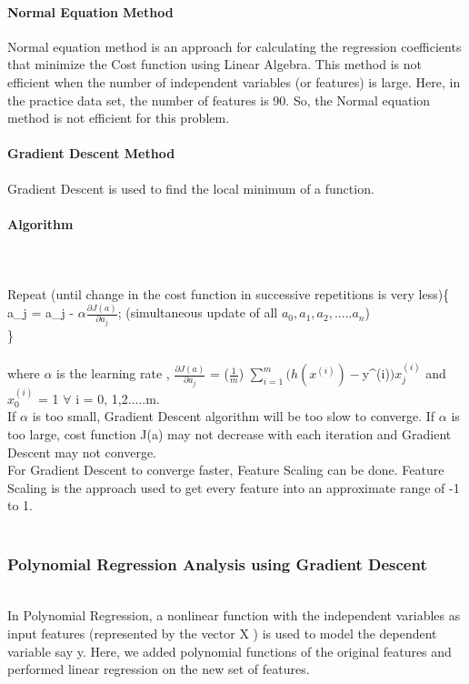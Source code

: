 \documentclass[10pt]{article}
\begin{document}
\paragraph{Normal Equation Method} 
Normal equation method is an approach for calculating the regression coefficients that minimize the Cost function using Linear Algebra. This method is not efficient when the number of independent variables (or features) is large. Here, in the practice data set, the number of features is 90. So, the Normal equation method is not efficient for this problem. 

\paragraph{Gradient Descent Method} 
Gradient Descent is used to find the local minimum of a function. \\
\paragraph{Algorithm}
\\\\Repeat (until change in the cost function in successive repetitions is very less)\{\\
\hfill	a_j = a_j  - $\alpha \frac{\partial J(a)}{\partial a_j} $;  (simultaneous update of all $a_0,a_1,a_2,.....a_n$)       
\\\hfill	\}
\\\\where $\alpha$ is the learning rate , $\frac{\partial J(a)}{\partial a_j}$ = ($\frac{1}{m}$) $\sum\limits_{i=1}^m (h(x^{(i)})-$y^{(i)}$)x_j^{(i)}$ and $x_0^{(i)}$ = 1 $\forall$ i = 0, 1,2.....m.
\\If $\alpha$ is too small, Gradient Descent algorithm will be too slow to converge. If $\alpha$ is too large, cost function J(a) may not decrease with each iteration and Gradient Descent may not converge.
\\For Gradient Descent to converge faster, Feature Scaling can be done. Feature Scaling is the approach used to get every feature into an approximate range of -1 to 1.\\\\
\subsubsection{Polynomial Regression Analysis using Gradient Descent}
\\In Polynomial Regression, a nonlinear function with the independent variables as input features (represented by the vector X ) is used to model the dependent variable say y. Here, we added polynomial functions of the original features and performed linear regression on the new set of features.\\
\end{document}
